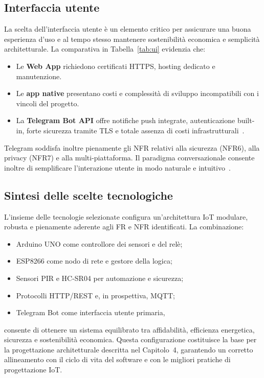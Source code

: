    \subsection{Interfaccia utente} La scelta dell’interfaccia utente è un elemento critico per assicurare una buona esperienza d’uso e al tempo stesso mantenere sostenibilità economica e semplicità architetturale. La comparativa in Tabella~\ref{tab:ui} evidenzia che: \begin{itemize} \item Le \textbf{Web App} richiedono certificati HTTPS, hosting dedicato e manutenzione. \item Le \textbf{app native} presentano costi e complessità di sviluppo incompatibili con i vincoli del progetto. \item La \textbf{Telegram Bot API} offre notifiche push integrate, autenticazione built-in, forte sicurezza tramite TLS e totale assenza di costi infrastrutturali~\cite{TelegramAPI}. \end{itemize} Telegram soddisfa inoltre pienamente gli NFR relativi alla sicurezza (NFR6), alla privacy (NFR7) e alla multi-piattaforma. Il paradigma conversazionale consente inoltre di semplificare l’interazione utente in modo naturale e intuitivo~\cite{Guinard2016}. \subsection{Sintesi delle scelte tecnologiche} L’insieme delle tecnologie selezionate configura un’architettura IoT modulare, robusta e pienamente aderente agli FR e NFR identificati. La combinazione: \begin{itemize} \item Arduino UNO come controllore dei sensori e del relè; \item ESP8266 come nodo di rete e gestore della logica; \item Sensori PIR e HC-SR04 per automazione e sicurezza; \item Protocolli HTTP/REST e, in prospettiva, MQTT; \item Telegram Bot come interfaccia utente primaria, \end{itemize} consente di ottenere un sistema equilibrato tra affidabilità, efficienza energetica, sicurezza e sostenibilità economica. Questa configurazione costituisce la base per la progettazione architetturale descritta nel Capitolo~4, garantendo un corretto allineamento con il ciclo di vita del software e con le migliori pratiche di progettazione IoT. 
   
